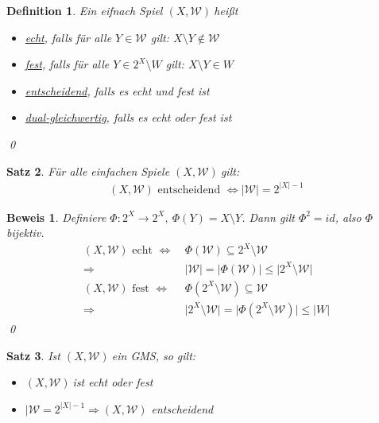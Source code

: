 \documentclass[ngerman]{scrartcl}
\theoremstyle{custom}
\newtheorem{mdef}{Definition} \numberwithin{mdef}{subsection}
\newtheorem{ms}[mdef]{Satz}
\newtheorem*{bw}{Beweis}
\newcommand{\0}{\mathbf{0}}
\newcommand{\1}{\mathbf{L}}
\newcommand{\sg}{$(X,\mathcal{W})~$}
\newcommand{\W}{\mathcal{W}}
\begin{document}
\begin{mdef}
Ein eifnach Spiel \sg hei\ss t 
\begin{itemize}
\item[(1)] \underline{echt}, falls f\"ur alle $Y \in \W$ gilt: $X
  \setminus Y \not \in \W$
\item[(2)] \underline{fest}, falls f\"ur alle $Y \in 2^X \setminus W$ gilt: $X
  \setminus Y \in W$
\item[(3)] \underline{entscheidend}, falls es echt \emph{und}
  fest ist
\item[(4)] \underline{dual-gleichwertig}, falls es echt \emph{oder}
  fest ist
\end{itemize}
\qed
\end{mdef}

\begin{ms}
F\"ur alle einfachen Spiele \sg gilt:
\begin{align*}
(X, \W) \text{ entscheidend } \Leftrightarrow \vert \W \vert =
2^{\vert X \vert -1}
\end{align*}
\end{ms}

\begin{bw}
Definiere $\Phi: 2^X \rightarrow 2^X, ~\Phi(Y) = X \setminus Y$. Dann
gilt $\Phi^2 = id$, also $\Phi$ bijektiv.
\begin{align*}
(X,\W) \text{ echt } \Leftrightarrow&~ \Phi(\W) \subseteq 2^X \setminus \W\\
\Rightarrow&~ \vert \W \vert = \vert \Phi(\W) \vert \leq \vert 2^X
\setminus \W \vert\\
(X,\W) \text{ fest } \Leftrightarrow&~ \Phi(2^X \setminus \W)
\subseteq \W\\
\Rightarrow&~ \vert 2^X \setminus \W \vert = \vert \Phi(2^X \setminus
\W) \vert
\leq \vert W \vert
\end{align*}
\qed
\end{bw}

\begin{ms}
Ist \sg ein GMS, so gilt:
\begin{itemize}
\item[(1)] \sg ist echt oder fest
\item[(2)] $\vert \W = 2^{\vert X \vert -1} \Rightarrow (X,\W)$
  entscheidend
\end{itemize}
\end{ms}
\end{document}
